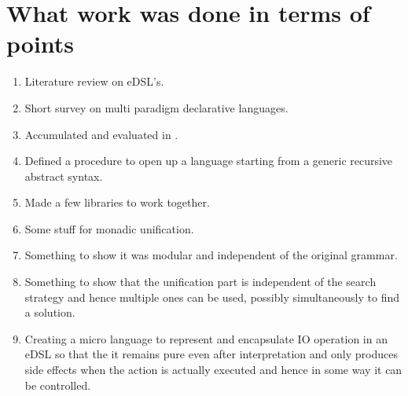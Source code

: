 \documentclass[thesis-solanki.tex]{subfiles}
\begin{document}
\section{What work was done in terms of points}
\begin{enumerate}
\item Literature review on eDSL's.  

\item Short survey on multi paradigm declarative languages.

\item Accumulated and evaluated  in .

\item Defined a procedure to open up a language starting from a generic recursive abstract syntax.

\item Made a few libraries to work together.

\item Some stuff for monadic unification.

\item Something to show it was modular and independent of the original grammar.

\item Something to show that the unification part is independent of the search strategy and hence multiple ones can be used, possibly 
simultaneously to find a solution.

\item Creating a micro language to represent and encapsulate IO operation in an eDSL so that the it remains pure even after interpretation 
and only produces side effects when the action is actually executed and hence in some way it can be controlled. 

\end{enumerate}
\end{document}
